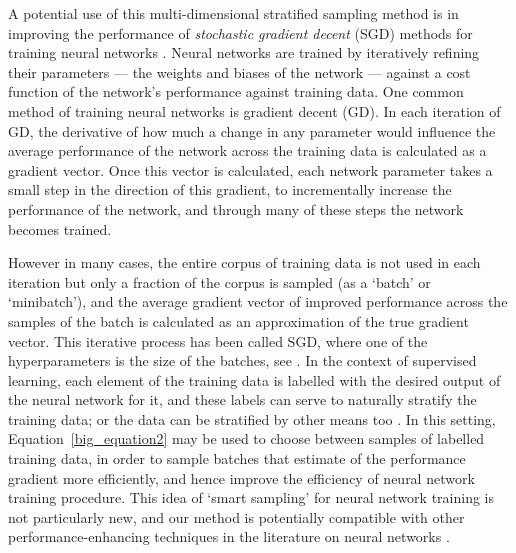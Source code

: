A potential use of this multi-dimensional stratified sampling method is in improving the performance of \textit{stochastic gradient decent} (SGD) methods for training neural networks \citep{2016arXiv160904747R}.
Neural networks are trained by iteratively refining their parameters --- the weights and biases of the network --- against a cost function of the network's performance against training data.
One common method of training neural networks is gradient decent (GD).
In each iteration of GD, the derivative of how much a change in any parameter would influence the average performance of the network across the training data is calculated as a gradient vector.
Once this vector is calculated, each network parameter takes a small step in the direction of this gradient, to incrementally increase the performance of the network, 
and through many of these steps the network becomes trained.

However in many cases, the entire corpus of training data is not used in each iteration but only a fraction of the corpus is sampled (as a `batch' or `minibatch'), and the average gradient vector of improved performance across the samples of the batch is calculated as an approximation of the true gradient vector. 
This iterative process has been called SGD, where one of the hyperparameters is the size of the batches, see \cite{DBLP:journals/corr/KeskarMNST16}.
In the context of supervised learning, each element of the training data is labelled with the desired output of the neural network for it, and these labels can serve to naturally stratify the training data; or the data can be stratified by other means too \citep{DBLP:journals/corr/ZhangKM17,DBLP:journals/corr/abs-1804-02772,2014arXiv1405.3080Z}.
In this setting, Equation~\ref{big_equation2} may be used to choose between samples of labelled training data, in order to sample batches that estimate of the performance gradient more efficiently, and hence improve the efficiency of neural network training procedure.
This idea of `smart sampling' for neural network training is not particularly new, and our method is potentially compatible with other performance-enhancing techniques in the literature on neural networks \citep{10.1007/978-3-319-24486-0_21,article123123131}.





